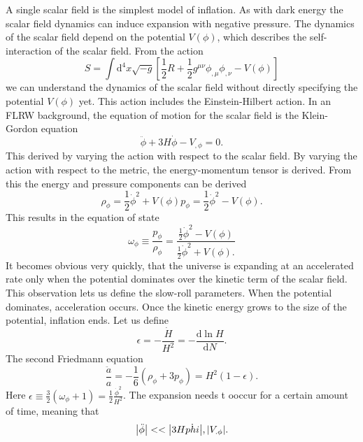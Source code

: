 \documentclass[12pt]{article}
\begin{document}
A single scalar field is the simplest model of inflation. As with dark energy the scalar field dynamics can induce expansion with negative pressure. The dynamics of the scalar field depend on the potential $V(\phi)$, which describes the self-interaction of the scalar field. From the action
\begin{equation}
    S = \int\mathrm{d}^4x \sqrt{-g}\left[\frac{1}{2}R + \frac{1}{2}g^{\mu\nu}\phi_{,\mu}\phi_{,\nu} - V(\phi)\right]
\end{equation}
we can understand the dynamics of the scalar field without directly specifying the potential $V(\phi)$ yet. This action includes the Einstein-Hilbert action. In an FLRW background, the equation of motion for the scalar field is the Klein-Gordon equation
\begin{equation}
    \ddot{\phi} + 3H\dot{\phi} - V_{,\phi} = 0.
\end{equation}
This derived by varying the action with respect to the scalar field. By varying the action with respect to the metric, the energy-momentum tensor is derived. From this the energy and pressure components can be derived
\begin{equation}
    \rho_\phi = \frac{1}{2} \dot{\phi}^2 + V(\phi)  p_\phi = \frac{1}{2} \dot{\phi}^2 - V(\phi).
\end{equation}
This results in the equation of state 
\begin{equation}
    \omega_\phi \equiv \frac{p_\phi}{\rho_\phi} = \frac{\frac{1}{2} \dot{\phi}^2 - V(\phi)}{\frac{1}{2} \dot{\phi}^2 + V(\phi).}
\end{equation}
It becomes obvious very quickly, that the universe is expanding at an accelerated rate only when the potential dominates over the kinetic term of the scalar field. This observation lets us define the slow-roll parameters. When the potential dominates, acceleration occurs. Once the kinetic energy grows to the size of the potential, inflation ends. Let us define
\begin{equation}
    \epsilon = -\frac{\dot{H}}{H^2} = -\frac{\mathrm{d}\ln H}{\mathrm{d}N}.
\end{equation}
The second Friedmann equation
\begin{equation}
    \frac{\ddot{a}}{a} = - \frac{1}{6}(\rho_\phi + 3 p_\phi)= H^2 (1-\epsilon).
\end{equation}
Here $\epsilon \equiv \frac{3}{2}(\omega_\phi + 1) = \frac{1}{2} \frac{\dot{\phi}^2}{H^2}$. The expansion needs t ooccur for a certain amount of time, meaning that 
\begin{equation}
    \abs{\ddot{\phi}} << \abs{3H\dot{phi}}, \abs{V_{.\phi}}.
\end{equation}
\end{document}
